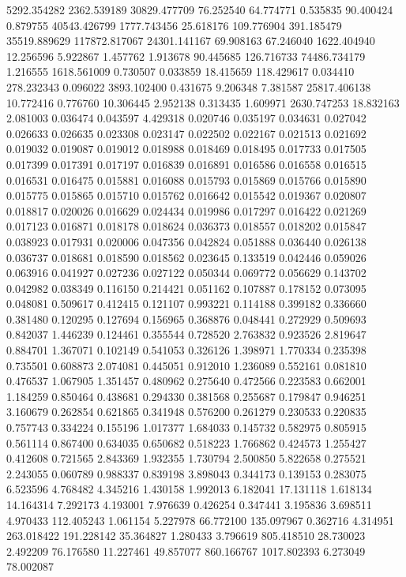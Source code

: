 5292.354282
2362.539189
30829.477709
76.252540
64.774771
0.535835
90.400424
0.879755
40543.426799
1777.743456
25.618176
109.776904
391.185479
35519.889629
117872.817067
24301.141167
69.908163
67.246040
1622.404940
12.256596
5.922867
1.457762
1.913678
90.445685
126.716733
74486.734179
1.216555
1618.561009
0.730507
0.033859
18.415659
118.429617
0.034410
278.232343
0.096022
3893.102400
0.431675
9.206348
7.381587
25817.406138
10.772416
0.776760
10.306445
2.952138
0.313435
1.609971
2630.747253
18.832163
2.081003
0.036474
0.043597
4.429318
0.020746
0.035197
0.034631
0.027042
0.026633
0.026635
0.023308
0.023147
0.022502
0.022167
0.021513
0.021692
0.019032
0.019087
0.019012
0.018988
0.018469
0.018495
0.017733
0.017505
0.017399
0.017391
0.017197
0.016839
0.016891
0.016586
0.016558
0.016515
0.016531
0.016475
0.015881
0.016088
0.015793
0.015869
0.015766
0.015890
0.015775
0.015865
0.015710
0.015762
0.016642
0.015542
0.019367
0.020807
0.018817
0.020026
0.016629
0.024434
0.019986
0.017297
0.016422
0.021269
0.017123
0.016871
0.018178
0.018624
0.036373
0.018557
0.018202
0.015847
0.038923
0.017931
0.020006
0.047356
0.042824
0.051888
0.036440
0.026138
0.036737
0.018681
0.018590
0.018562
0.023645
0.133519
0.042446
0.059026
0.063916
0.041927
0.027236
0.027122
0.050344
0.069772
0.056629
0.143702
0.042982
0.038349
0.116150
0.214421
0.051162
0.107887
0.178152
0.073095
0.048081
0.509617
0.412415
0.121107
0.993221
0.114188
0.399182
0.336660
0.381480
0.120295
0.127694
0.156965
0.368876
0.048441
0.272929
0.509693
0.842037
1.446239
0.124461
0.355544
0.728520
2.763832
0.923526
2.819647
0.884701
1.367071
0.102149
0.541053
0.326126
1.398971
1.770334
0.235398
0.735501
0.608873
2.074081
0.445051
0.912010
1.236089
0.552161
0.081810
0.476537
1.067905
1.351457
0.480962
0.275640
0.472566
0.223583
0.662001
1.184259
0.850464
0.438681
0.294330
0.381568
0.255687
0.179847
0.946251
3.160679
0.262854
0.621865
0.341948
0.576200
0.261279
0.230533
0.220835
0.757743
0.334224
0.155196
1.017377
1.684033
0.145732
0.582975
0.805915
0.561114
0.867400
0.634035
0.650682
0.518223
1.766862
0.424573
1.255427
0.412608
0.721565
2.843369
1.932355
1.730794
2.500850
5.822658
0.275521
2.243055
0.060789
0.988337
0.839198
3.898043
0.344173
0.139153
0.283075
6.523596
4.768482
4.345216
1.430158
1.992013
6.182041
17.131118
1.618134
14.164314
7.292173
4.193001
7.976639
0.426254
0.347441
3.195836
3.698511
4.970433
112.405243
1.061154
5.227978
66.772100
135.097967
0.362716
4.314951
263.018422
191.228142
35.364827
1.280433
3.796619
805.418510
28.730023
2.492209
76.176580
11.227461
49.857077
860.166767
1017.802393
6.273049
78.002087
